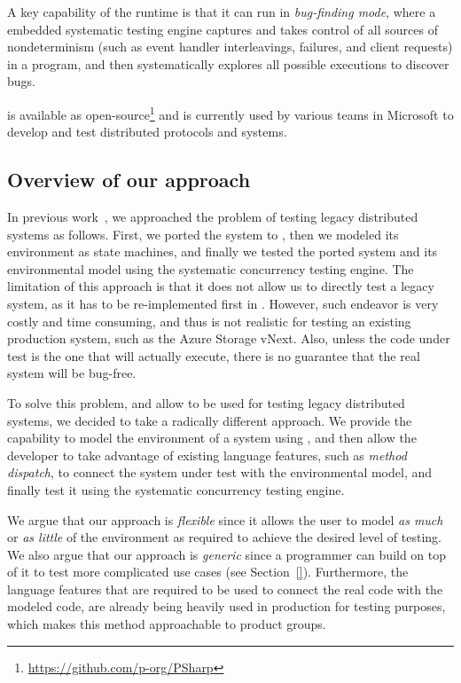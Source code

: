 A key capability of the \psharp runtime is that it can run in \emph{bug-finding mode}, where a embedded systematic testing engine captures and takes control of all sources of nondeterminism (such as event handler interleavings, failures, and client requests) in a \psharp program, and then systematically explores all possible executions to discover bugs.

\psharp is available as open-source\footnote{\url{https://github.com/p-org/PSharp}} and is currently used by various teams in Microsoft to develop and test distributed protocols and systems.


\subsection{Overview of our approach}
\label{sec:method:model}

In previous work~\cite{deligiannis2015psharp}, we approached the problem of testing legacy distributed systems as follows. First, we ported the system to \psharp, then we modeled its environment as \psharp state machines, and finally we tested the ported system and its environmental model using the \psharp systematic concurrency testing engine. The limitation of this approach is that it does not allow us to directly test a legacy system, as it has to be re-implemented first in \psharp. However, such endeavor is very costly and time consuming, and thus is not realistic for testing an existing production system, such as the Azure Storage vNext. Also, unless the code under test is the one that will actually execute, there is no guarantee that the real system will be bug-free.

To solve this problem, and allow \psharp to be used for testing legacy distributed systems, we decided to take a radically different approach. We provide the capability to model the environment of a system using \psharp, and then allow the developer to take advantage of existing language features, such as \emph{method dispatch}, to connect the system under test with the environmental model, and finally test it using the \psharp systematic concurrency testing engine.

We argue that our approach is \emph{flexible} since it allows the user to model \emph{as much} or \emph{as little} of the environment as required to achieve the desired level of testing. We also argue that our approach is \emph{generic} since a programmer can build on top of it to test more complicated use cases (see Section~\ref{}). Furthermore, the language features that are required to be used to connect the real code with the modeled code, are already being heavily used in production for testing purposes, which makes this method approachable to product groups.


